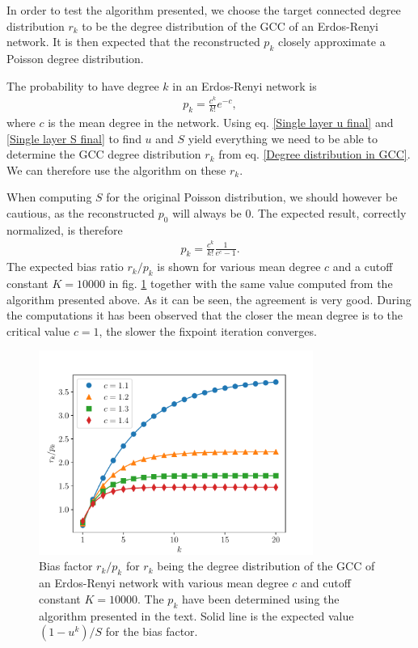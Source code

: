 \documentclass[
11pt, %
english, %
singlespacing, %
nolistspacing, %
liststotoc, %
headsepline, %
]{MastersDoctoralThesis} %
\begin{document}
In order to test the algorithm presented, we choose the target connected degree distribution $r_k$ to be the degree distribution of the GCC of an Erdos-Renyi network. It is then expected that the reconstructed $p_k$ closely approximate a Poisson degree distribution.

The probability to have degree $k$ in an Erdos-Renyi network is
\begin{align}
	p_k = \frac{c^k}{k!} e^{-c},
\end{align}
where $c$ is the mean degree in the network. Using eq. \eqref{Single layer u final} and \eqref{Single layer S final} to find $u$ and $S$ yield everything we need to be able to determine the GCC degree distribution $r_k$ from eq. \eqref{Degree distribution in GCC}. We can therefore use the algorithm on these $r_k$.

When computing $S$ for the original Poisson distribution, we should however be cautious, as the reconstructed $p_0$ will always be $0$. The expected result, correctly normalized, is therefore
\begin{align}
	p_k = \frac{c^k}{k!} \frac{1}{e^{c} - 1}.
\end{align}
The expected bias ratio $r_k/p_k$ is shown for various mean degree $c$ and a cutoff constant $K = 10000$ in fig. \ref{Figure: Erdos-Renyi reconstruction} together with the same value computed from the algorithm presented above. As it can be seen, the agreement is very good. During the computations it has been observed that the closer the mean degree is to the critical value $c = 1$, the slower the fixpoint iteration converges.

\begin{figure}
	\includegraphics[width=0.8\textwidth]{ER_reconstruction.pdf}
	\caption{Bias factor $r_k/p_k$ for $r_k$ being the degree distribution of the GCC of an Erdos-Renyi network with various mean degree $c$ and cutoff constant $K = 10000$. The $p_k$ have been determined using the algorithm presented in the text. Solid line is the expected value $(1 - u^k)/S$ for the bias factor.}
	\label{Figure: Erdos-Renyi reconstruction}
\end{figure}
\end{document}
